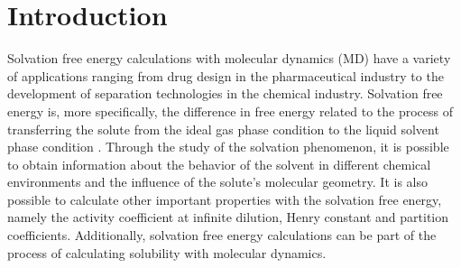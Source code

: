\chapter{Introduction} %
\label{Chapter1} %
\pagestyle{simple}
\onehalfspacing
Solvation free energy calculations with molecular dynamics (MD) have a variety of applications ranging from drug design in the pharmaceutical industry to the development of separation technologies in the chemical industry. {Solvation free energy is, more specifically, the difference in free energy related to the process of transferring the solute from the ideal gas phase condition to the liquid solvent phase condition \cite{shirts2013}}. Through the study of the solvation phenomenon, it is possible to obtain information about the behavior of the solvent in different chemical environments and the influence of the solute's molecular geometry. It is also possible to calculate other important properties with the solvation free energy, namely the activity coefficient at infinite dilution, Henry constant and partition coefficients.{ Additionally, solvation free energy calculations can be part of the process of calculating solubility with molecular dynamics}. 

